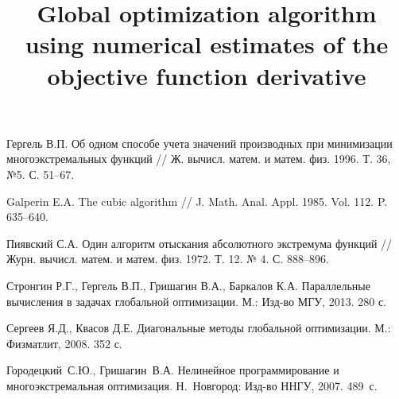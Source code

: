 \documentclass[11pt, oneside, a4paper]{article}
\begin{document}
\begin{biblio}





Гергель В.П. Об одном способе учета значений производных при минимизации многоэкстремальных функций // Ж. вычисл. матем. и матем. физ. 1996. Т. 36, №5. С. 51--67.

Galperin E.A. The cubic algorithm // J. Math. Anal. Appl. 1985. Vol. 112. P. 635--640.

Пиявский С.А. Один алгоритм отыскания абсолютного экстремума функций // Журн. вычисл. матем. и матем. физ. 1972. Т. 12. № 4. С. 888--896.

Стронгин Р.Г., Гергель В.П., Гришагин В.А., Баркалов К.А. Параллельные вычисления в задачах глобальной оптимизации. М.: Изд-во МГУ, 2013. 280 с.

 Сергеев Я.Д., Квасов Д.Е. Диагональные методы глобальной оптимизации. М.: Физматлит, 2008. 352 с. 

 Городецкий~С.Ю., Гришагин~В.А. Нелинейное программирование и многоэкстремальная оптимизация. Н.~Новгород: Изд-во ННГУ, 2007. 489~с.




\end{biblio}


\title{Global optimization algorithm using numerical estimates of the objective function derivative}

\end{document}
